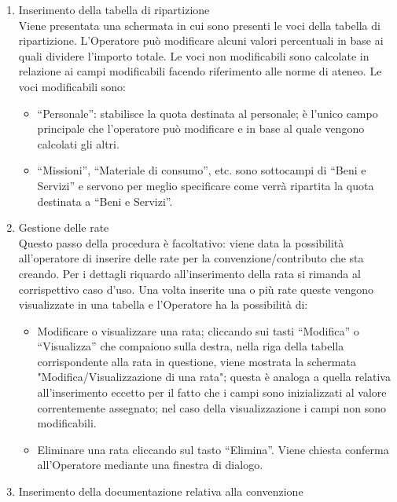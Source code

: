 \begin{enumerate}
\begin{enumerate}
    \item Inserimento della tabella di ripartizione\\
     
      Viene presentata una schermata in cui sono presenti le voci della tabella di ripartizione. L'Operatore può modificare alcuni valori percentuali 
      in base ai quali dividere l'importo totale. Le voci non modificabili sono calcolate in relazione ai campi modificabili facendo riferimento alle norme di ateneo. Le voci modificabili sono:
      \begin{itemize}
	\item ``Personale'': stabilisce la quota destinata al personale; è l'unico campo principale che l'operatore può modificare e in base al quale vengono calcolati gli altri.
	\item ``Missioni'', ``Materiale di consumo'', etc. sono sottocampi di ``Beni e Servizi'' e servono per meglio specificare come verrà ripartita la quota destinata a ``Beni e Servizi''.
      \end{itemize}
    \item Gestione delle rate\\
      
      Questo passo della procedura è facoltativo: viene data la possibilità all'operatore di inserire delle rate per la convenzione/contributo
      che sta creando. Per i dettagli riquardo all'inserimento della rata si rimanda al corrispettivo caso d'uso. Una volta inserite una o più rate
      queste vengono visualizzate in una tabella e l'Operatore
      ha la possibilità di:
      \begin{itemize}
       \item  Modificare o visualizzare una rata; cliccando sui tasti ``Modifica'' o ``Visualizza'' che compaiono sulla destra, nella riga della tabella
       corrispondente alla rata in questione, viene mostrata la schermata "Modifica/Visualizzazione di una rata"; questa è analoga a quella relativa all'inserimento
       eccetto per il fatto che i campi	sono inizializzati al valore correntemente assegnato; nel caso della visualizzazione i campi non sono modificabili.
			
	\item Eliminare una rata cliccando sul tasto ``Elimina''. Viene chiesta conferma all'Operatore mediante una finestra di dialogo.

      \end{itemize}

      
    \item Inserimento della documentazione relativa alla convenzione\\
	  

\end{enumerate}
\end{enumerate}
